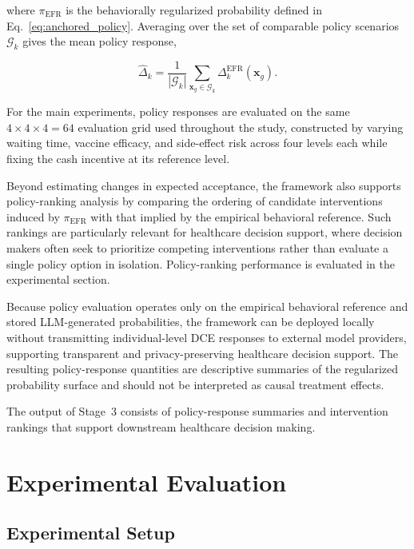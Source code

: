 \documentclass[11pt]{article}
\begin{document}
where $\pi_{\mathrm{EFR}}$ is the behaviorally regularized probability defined in Eq.~\eqref{eq:anchored_policy}. Averaging over the set of comparable policy scenarios $\mathcal{G}_k$ gives the mean policy response,

\[
\widehat{\Delta}_k
=
\frac{1}{|\mathcal{G}_k|}
\sum_{\mathbf{x}_g\in\mathcal{G}_k}
\Delta_k^{\mathrm{EFR}}(\mathbf{x}_g).
\]

For the main experiments, policy responses are evaluated on the same $4\times4\times4=64$ evaluation grid used throughout the study, constructed by varying waiting time, vaccine efficacy, and side-effect risk across four levels each while fixing the cash incentive at its reference level.

Beyond estimating changes in expected acceptance, the framework also supports policy-ranking analysis by comparing the ordering of candidate interventions induced by $\pi_{\mathrm{EFR}}$ with that implied by the empirical behavioral reference. Such rankings are particularly relevant for healthcare decision support, where decision makers often seek to prioritize competing interventions rather than evaluate a single policy option in isolation. Policy-ranking performance is evaluated in the experimental section.

Because policy evaluation operates only on the empirical behavioral reference and stored LLM-generated probabilities, the framework can be deployed locally without transmitting individual-level DCE responses to external model providers, supporting transparent and privacy-preserving healthcare decision support. The resulting policy-response quantities are descriptive summaries of the regularized probability surface and should not be interpreted as causal treatment effects.

The output of Stage~3 consists of policy-response summaries and intervention rankings that support downstream healthcare decision making.



\clearpage

\clearpage
\section{Experimental Evaluation}

\subsection{Experimental Setup}
\label{sec:setup}
\end{document}
